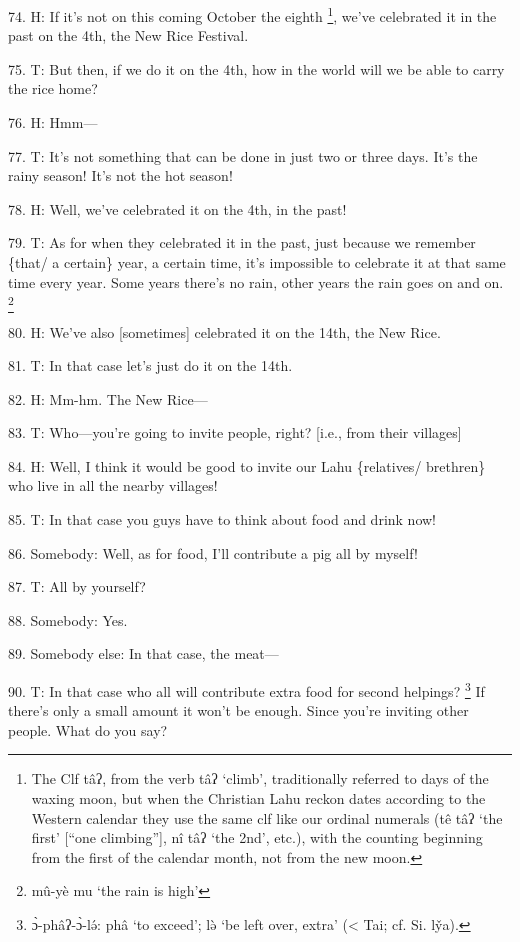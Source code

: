 74. H: If it's not on this coming October the eighth \footnote{The Clf tâʔ, from the verb tâʔ `climb', traditionally referred to days of the waxing moon, but when the Christian Lahu reckon dates according to the Western calendar they use the same clf like our ordinal numerals (tê tâʔ `the first' [``one climbing''], nî tâʔ `the 2nd', etc.), with the counting beginning from the first of the calendar month, not from the new moon.}, we've celebrated it
in the past on the 4th, the New Rice Festival.

75. T: But then, if we do it on the 4th, how in the world will we be able to carry
the rice home?

76. H: Hmm---

77. T: It's not something that can be done in just two or three days.  It's the
rainy season!  It's not the hot season!

78. H: Well, we've celebrated it on the 4th, in the past!

79. T: As for when they celebrated it in the past, just because we remember \{that/
a certain\} year, a certain time, it's impossible to celebrate it at that same
time every year.  Some years there's no rain, other years the rain goes on and
on. \footnote{mû-yè mu `the rain is high'}

80. H: We've also [sometimes] celebrated it on the 14th, the New Rice.

81. T: In that case let's just do it on the 14th.

82. H: Mm-hm.  The New Rice---

83. T: Who---you're going to invite people, right? [i.e., from their villages]

84. H: Well, I think it would be good to invite our Lahu \{relatives/ brethren\}
who live in all the nearby villages!

85. T: In that case you guys have to think about food and drink now!

86. Somebody: Well, as for food, I'll contribute a pig all by myself!

87. T: All by yourself?

88.  Somebody: Yes.

89. Somebody else: In that case, the meat---

90. T: In that case who all will contribute extra food for second helpings? \footnote{ɔ̀-phâʔ-ɔ̀-lə́: phâ `to exceed'; lə̀ `be left over, extra' (< Tai; cf. Si. ly̌a).}
If there's only a small amount it won't be enough.  Since you're inviting other
people.  What do you say?

